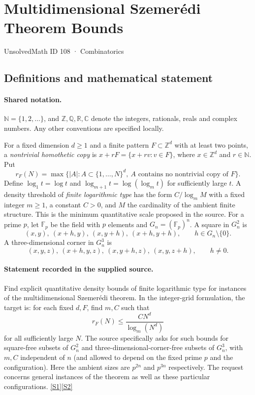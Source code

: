 \documentclass[11pt]{article}
\newcommand{\sref}[2]{\hyperlink{source:#1:#2}{[S#2]}}
\begin{document}
\setcounter{section}{107}
\section{Multidimensional Szemerédi Theorem Bounds}\label{108}
{\small\sffamily UnsolvedMath ID 108 · Combinatorics}
\subsection{Definitions and mathematical statement}

\paragraph{Shared notation.}$\mathbb N=\{1,2,\ldots\}$, and $\mathbb Z,\mathbb Q,\mathbb R,\mathbb C$ denote the integers, rationals, reals and complex numbers. Any other conventions are specified locally.


For a fixed dimension $d\ge1$ and a finite pattern $F\subset\mathbb Z^d$ with at least two points, a \emph{nontrivial homothetic copy} is $x+rF=\{x+rv:v\in F\}$, where $x\in\mathbb Z^d$ and $r\in\mathbb N$. Put
\[
r_F(N)=\max\{|A|:A\subset\{1,\ldots,N\}^d,\ A\text{ contains no nontrivial copy of }F\}.
\]
Define $\log_1 t=\log t$ and $\log_{m+1}t=\log(\log_m t)$ for sufficiently large $t$. A density threshold of \emph{finite logarithmic type} has the form $C/\log_m M$ with a fixed integer $m\ge1$, a constant $C>0$, and $M$ the cardinality of the ambient finite structure. This is the minimum quantitative scale proposed in the source.
For a prime $p$, let $\mathbb F_p$ be the field with $p$ elements and $G_n=(\mathbb F_p)^n$. A square in $G_n^2$ is
\[
(x,y),\ (x+h,y),\ (x,y+h),\ (x+h,y+h),\qquad h\in G_n\setminus\{0\}.
\]
A three-dimensional corner in $G_n^3$ is
\[
(x,y,z),\ (x+h,y,z),\ (x,y+h,z),\ (x,y,z+h),\qquad h\ne0.
\]
\paragraph{Statement recorded in the supplied source.}
Find explicit quantitative density bounds of finite logarithmic type for instances of the multidimensional Szemerédi theorem. In the integer-grid formulation, the target is: for each fixed $d,F$, find $m,C$ such that
\[
r_F(N)\le\frac{C N^d}{\log_m(N^d)}
\]
for all sufficiently large $N$. The source specifically asks for such bounds for square-free subsets of $G_n^2$ and three-dimensional-corner-free subsets of $G_n^3$, with $m,C$ independent of $n$ (and allowed to depend on the fixed prime $p$ and the configuration). Here the ambient sizes are $p^{2n}$ and $p^{3n}$ respectively. The request concerns general instances of the theorem as well as these particular configurations. \sref{108}{1}\sref{108}{2}
\end{document}
